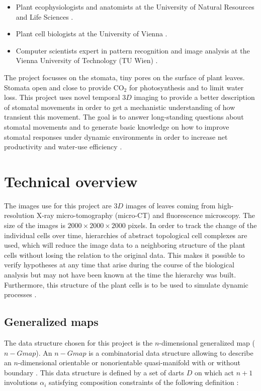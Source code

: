 \begin{itemize}
    \item Plant ecophysiologists and anatomists at the University of Natural Resources 
    and Life Sciences \cite{BOKU}.
    \item Plant cell biologists at the University of Vienna \cite{UVI}.
    \item Computer scientists expert in pattern recognition and image analysis at the 
    Vienna University of Technology (TU Wien) \cite{TUV}.
\end{itemize}
%
The project focusses on the stomata, tiny pores on the surface of plant leaves. 
Stomata open and close to provide $\mathrm{CO_2}$ for photosynthesis and to limit 
water loss. This project uses novel temporal $3D$ imaging to provide a better description 
of stomatal movements in order to get a mechanistic understanding of how transient 
this movement. The goal is to answer long-standing questions about stomatal movements 
and to generate basic knowledge on how to improve stomatal responses under dynamic 
environments in order to increase net productivity and water-use efficiency \cite{WGH}.
         
\section{Technical overview}

The images use for this project are $3D$ images of leaves coming from high-resolution 
X-ray micro-tomography (micro-CT) and fluorescence microscopy. The size of the images is
$2000 \times 2000 \times 2000$ pixels. In order to track the change of the individual 
cells over time, hierarchies of abstract topological cell complexes are used, which will
reduce the image data to a neighboring structure of the plant cells without losing the
relation to the original data. This makes it possible to verify hypotheses at any time
that arise during the course of the biological analysis but may not have been known at
the time the hierarchy was built. Furthermore, this structure of the plant cells is to be
used to simulate dynamic processes \cite{PWGH}.

\subsection{Generalized maps}

The data structure chosen for this project is the $n$-dimensional generalized map
($n-Gmap$). An $n-Gmap$ is a combinatorial data structure allowing to describe an
$n$-dimensional orientable or nonorientable quasi-manifold with or without boundary
\cite{Lienhardt}. This data structure is defined by a set of darts $D$ on which act
$n+1$ involutions $\alpha_i$ satisfying composition constraints of the following
definition \cite{Damiand}:

